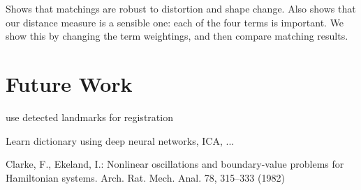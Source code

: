 \documentclass{llncs}
\begin{document}
Shows that matchings are robust to distortion and shape change.
Also shows that our distance measure is a sensible one: each of the four terms is important. We show this by changing the term weightings, and then compare matching results.

\section{Future Work}

use detected landmarks for registration

Learn dictionary using deep neural networks, ICA, ...



%
%
\begin{thebibliography}{5}
%
Clarke, F., Ekeland, I.:
Nonlinear oscillations and
boundary-value problems for Hamiltonian systems.
Arch. Rat. Mech. Anal. 78, 315--333 (1982)

\end{thebibliography}
\end{document}
